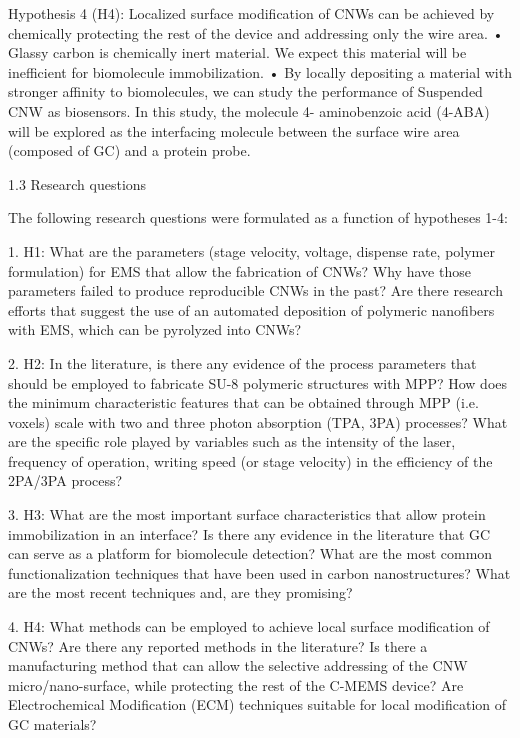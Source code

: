 Hypothesis 4 (H4): Localized surface modification of CNWs can be achieved by chemically protecting the rest of the device and addressing only the wire area.
• Glassy carbon is chemically inert material. We expect this material will be inefficient for biomolecule immobilization.
• By locally depositing a material with stronger affinity to biomolecules, we can study the performance of Suspended CNW as biosensors. In this study, the molecule 4- aminobenzoic acid (4-ABA) will be explored as the interfacing molecule between the surface wire area (composed of GC) and a protein probe.

1.3 Research questions

The following research questions were formulated as a function of hypotheses 1-4:

1. H1: What are the parameters (stage velocity, voltage, dispense rate, polymer formulation) for EMS that allow the fabrication of CNWs? Why have those parameters failed to produce reproducible CNWs in the past? Are there research efforts that suggest the use of an automated deposition of polymeric nanofibers with EMS, which can be pyrolyzed into CNWs?

2. H2: In the literature, is there any evidence of the process parameters that should be employed to fabricate SU-8 polymeric structures with MPP? How does the minimum characteristic features that can be obtained through MPP (i.e. voxels) scale with two and three photon absorption (TPA, 3PA) processes? What are the specific role played by variables such as the intensity of the laser, frequency of operation, writing speed (or stage velocity) in the efficiency of the 2PA/3PA process?

3. H3: What are the most important surface characteristics that allow protein immobilization in an interface? Is there any evidence in the literature that GC can serve as a platform for biomolecule detection? What are the most common functionalization techniques that have been used in carbon nanostructures? What are the most recent techniques and, are they promising?

4. H4: What methods can be employed to achieve local surface modification of CNWs? Are there any reported methods in the literature? Is there a manufacturing method that can allow the selective addressing of the CNW micro/nano-surface, while protecting the rest of the C-MEMS device? Are Electrochemical Modification (ECM) techniques suitable for local modification of GC materials?